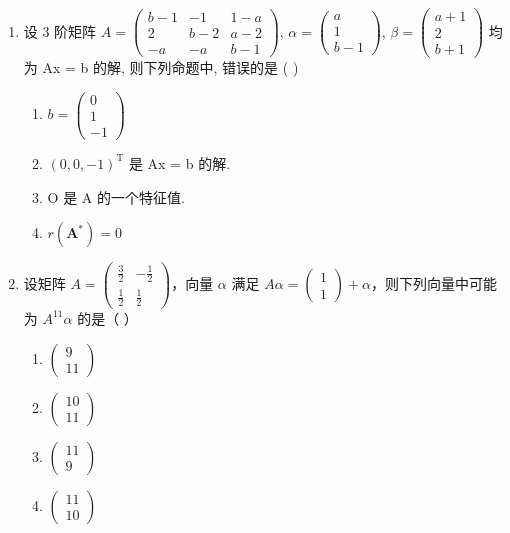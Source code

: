 \documentclass[12pt, a4paper]{ctexart}
\begin{document}
\begin{enumerate}
    \item 设 3 阶矩阵 $ A = \begin{pmatrix} b - 1 & -1 & 1 - a \\ 2 & b - 2 & a - 2 \\ -a & -a & b - 1 \end{pmatrix} $, $ \alpha = \begin{pmatrix} a \\ 1 \\ b - 1 \end{pmatrix} $, $ \beta = \begin{pmatrix} a + 1 \\ 2 \\ b + 1 \end{pmatrix} $ 均为 Ax = b 的解, 则下列命题中, 错误的是 ( \underline{\hspace{1cm}} )
    \begin{enumerate}[label=(\Alph*)]
        \item $ b = \begin{pmatrix} 0 \\ 1 \\ -1 \end{pmatrix} $
        \item $ (0,0,-1)^{\mathrm{T}} $ 是 Ax = b 的解.
        \item O 是 A 的一个特征值.
        \item $ r\left(\mathbf{A}^{*}\right)=0 $
    \end{enumerate}

    \item 设矩阵 $ A = \begin{pmatrix} \frac{3}{2} & -\frac{1}{2} \\ \frac{1}{2} & \frac{1}{2} \end{pmatrix} $，向量 $ \alpha $ 满足 $ A\alpha = \begin{pmatrix} 1 \\ 1 \end{pmatrix} + \alpha $，则下列向量中可能为 $ A^{11}\alpha $ 的是（ \underline{\hspace{1cm}} ）
    \begin{enumerate}[label=(\Alph*)]
        \item $ \begin{pmatrix}9\\11\end{pmatrix} $
        \item $ \begin{pmatrix}10\\11\end{pmatrix} $
        \item $ \begin{pmatrix}11\\9\end{pmatrix} $
        \item $ \begin{pmatrix}11\\10\end{pmatrix} $
    \end{enumerate}


\end{enumerate}
\end{document}
